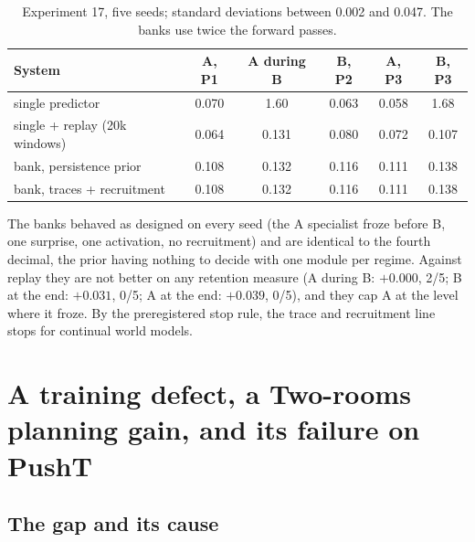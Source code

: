 \documentclass[11pt,a4paper]{article}
\begin{document}
\begin{table}[h]
\centering\small\setlength{\tabcolsep}{4pt}
\begin{tabular}{lccccc}
\toprule
System & A, P1 & A during B & B, P2 & A, P3 & B, P3 \\
\midrule
single predictor & 0.070 & 1.60 & 0.063 & 0.058 & 1.68 \\
single + replay (20k windows) & 0.064 & 0.131 & 0.080 & 0.072 & 0.107 \\
bank, persistence prior & 0.108 & 0.132 & 0.116 & 0.111 & 0.138 \\
bank, traces + recruitment & 0.108 & 0.132 & 0.116 & 0.111 & 0.138 \\
\bottomrule
\end{tabular}
\caption{Experiment 17, five seeds; standard deviations between 0.002 and 0.047. The banks use twice the forward passes.}
\label{tab:exp17}
\end{table}

The banks behaved as designed on every seed (the A specialist froze before B, one surprise, one activation, no recruitment) and are identical to the fourth decimal, the prior having nothing to decide with one module per regime. Against replay they are not better on any retention measure (A during B: $+0.000$, 2/5; B at the end: $+0.031$, 0/5; A at the end: $+0.039$, 0/5), and they cap A at the level where it froze. By the preregistered stop rule, the trace and recruitment line stops for continual world models.

\section{A training defect, a Two-rooms planning gain, and its failure on PushT}
\label{sec:gap}

\subsection{The gap and its cause}
\end{document}
